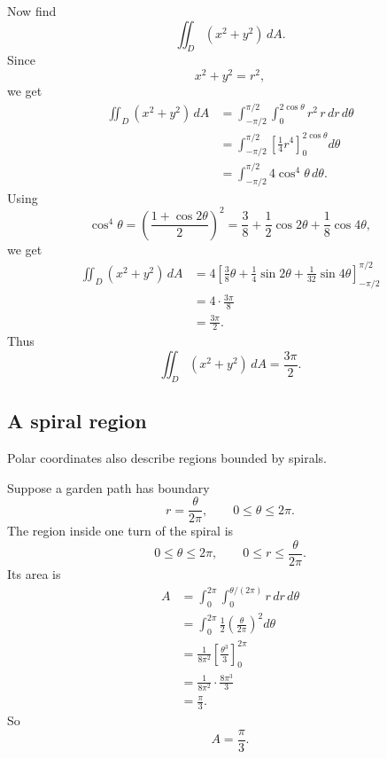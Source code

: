 Now find
\[
    \iint_D (x^2+y^2)\,dA.
\]
Since
\[
    x^2+y^2=r^2,
\]
we get
\[
\begin{aligned}
    \iint_D (x^2+y^2)\,dA
    &=
    \int_{-\pi/2}^{\pi/2}
    \int_0^{2\cos\theta}
    r^2\,r\,dr\,d\theta\\
    &=
    \int_{-\pi/2}^{\pi/2}
    \left[
        \frac14r^4
    \right]_0^{2\cos\theta}
    d\theta\\
    &=
    \int_{-\pi/2}^{\pi/2}
    4\cos^4\theta\,d\theta.
\end{aligned}
\]
Using
\[
    \cos^4\theta
    =
    \left(\frac{1+\cos2\theta}{2}\right)^2
    =
    \frac38+\frac12\cos2\theta+\frac18\cos4\theta,
\]
we get
\[
\begin{aligned}
    \iint_D (x^2+y^2)\,dA
    &=
    4\left[
        \frac38\theta
        +\frac14\sin2\theta
        +\frac1{32}\sin4\theta
    \right]_{-\pi/2}^{\pi/2}\\
    &=
    4\cdot\frac{3\pi}{8}\\
    &=
    \frac{3\pi}{2}.
\end{aligned}
\]
Thus
\[
\boxed{
    \iint_D (x^2+y^2)\,dA=\frac{3\pi}{2}.
}
\]

\subsection{A spiral region}

Polar coordinates also describe regions bounded by spirals.

Suppose a garden path has boundary
\[
    r=\frac{\theta}{2\pi},
    \qquad
    0\le\theta\le2\pi.
\]
The region inside one turn of the spiral is
\[
    0\le\theta\le2\pi,
    \qquad
    0\le r\le \frac{\theta}{2\pi}.
\]
Its area is
\[
\begin{aligned}
    A
    &=
    \int_0^{2\pi}
    \int_0^{\theta/(2\pi)}
    r\,dr\,d\theta\\
    &=
    \int_0^{2\pi}
    \frac12\left(\frac{\theta}{2\pi}\right)^2
    d\theta\\
    &=
    \frac{1}{8\pi^2}
    \left[
        \frac{\theta^3}{3}
    \right]_0^{2\pi}\\
    &=
    \frac{1}{8\pi^2}\cdot\frac{8\pi^3}{3}\\
    &=
    \frac{\pi}{3}.
\end{aligned}
\]
So
\[
\boxed{
    A=\frac{\pi}{3}.
}
\]

